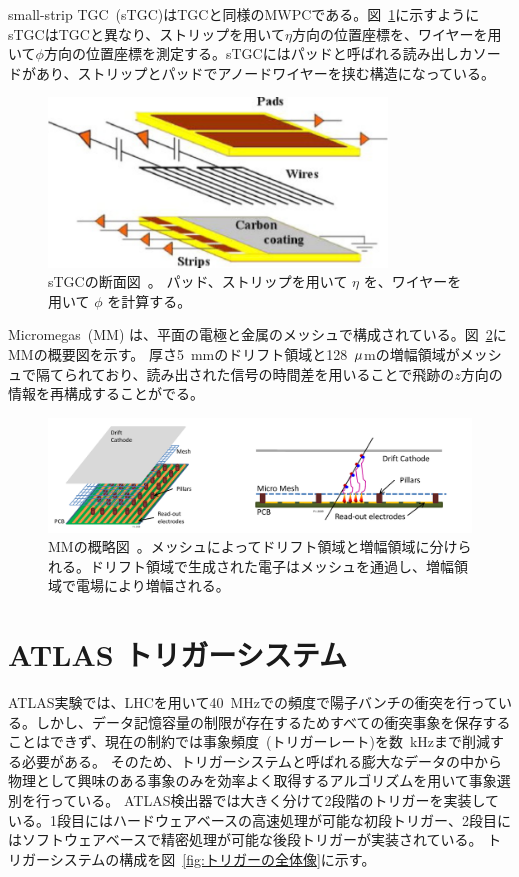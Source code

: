 small-strip TGC~(sTGC)はTGCと同様のMWPCである。図~\ref{fig:sTGC}に示すようにsTGCはTGCと異なり、ストリップを用いて$\eta$方向の位置座標を、ワイヤーを用いて$\phi$方向の位置座標を測定する。sTGCにはパッドと呼ばれる読み出しカソードがあり、ストリップとパッドでアノードワイヤーを挟む構造になっている。

\begin{figure}[tb]
  \centering
  \includegraphics[clip, width=9cm]{fig/2/stgc-structure.pdf}
  \caption{sTGCの断面図~\cite{article:NSW_tech}。 パッド、ストリップを用いて $\eta$ を、ワイヤーを用いて $\phi$ を計算する。}
  \label{fig:sTGC}
\end{figure}

Micromegas~(MM) は、平面の電極と金属のメッシュで構成されている。図~\ref{fig:MM}にMMの概要図を示す。
厚さ5~mmのドリフト領域と128~$\rm{\mu}$mの増幅領域がメッシュで隔てられており、読み出された信号の時間差を用いることで飛跡の$z$方向の情報を再構成することがでる。

\begin{figure}[tb]
  \centering
  \includegraphics[clip, width=15cm]{fig/2/mm-structure.pdf}
  \caption{MMの概略図~\cite{article:NSW_tech}。メッシュによってドリフト領域と増幅領域に分けられる。ドリフト領域で生成された電子はメッシュを通過し、増幅領域で電場により増幅される。}
  \label{fig:MM}
\end{figure}


\newpage
\section{ATLAS トリガーシステム}
ATLAS実験では、LHCを用いて40~MHzでの頻度で陽子バンチの衝突を行っている。しかし、データ記憶容量の制限が存在するためすべての衝突事象を保存することはできず、現在の制約では事象頻度~(トリガーレート)を数~kHzまで削減する必要がある。
そのため、トリガーシステムと呼ばれる膨大なデータの中から物理として興味のある事象のみを効率よく取得するアルゴリズムを用いて事象選別を行っている。
ATLAS検出器では大きく分けて2段階のトリガーを実装している。1段目にはハードウェアベースの高速処理が可能な初段トリガー、2段目にはソフトウェアベースで精密処理が可能な後段トリガーが実装されている。
トリガーシステムの構成を図~\ref{fig:トリガーの全体像}に示す。

